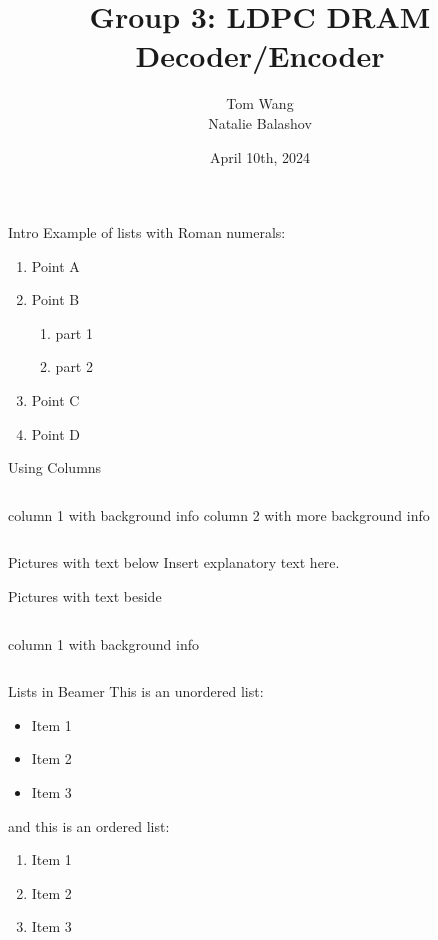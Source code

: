 \documentclass{beamer}
\title{Group 3: LDPC DRAM Decoder/Encoder}
\author{Tom Wang \\ Natalie Balashov}
\date{April 10th, 2024}
\begin{document}
\begin{frame}
    \titlepage
\end{frame}

\begin{frame}{Intro}
    Example of lists with Roman numerals:
    \begin{enumerate}[I]
        \item Point A
        \item Point B
              \begin{enumerate}[i]
                  \item part 1
                  \item part 2
              \end{enumerate}
        \item Point C
        \item Point D
    \end{enumerate}
\end{frame}

\begin{frame}{Using Columns}
    \begin{columns}
        column 1 with background info
        column 2 with more background info
    \end{columns}
\end{frame}

\begin{frame}{Pictures with text below}
    Insert explanatory text here.
\end{frame}

\begin{frame}{Pictures with text beside}
    \begin{columns}
        column 1 with background info
    \end{columns}
\end{frame}

\begin{frame}{Lists in Beamer}
    This is an unordered list:
    \begin{itemize}
        \item Item 1
        \item Item 2
        \item Item 3
    \end{itemize}
    and this is an ordered list:
    \begin{enumerate}
        \item Item 1
        \item Item 2
        \item Item 3
    \end{enumerate}
\end{frame}
\end{document}

